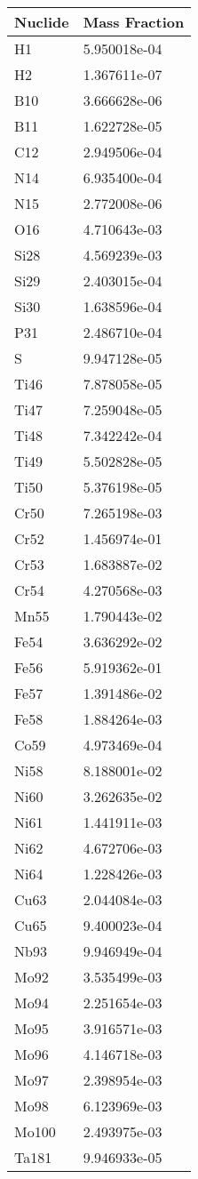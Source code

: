 \begin{centering}
\begin{longtable}[ht!]
\caption{Table showing the isotopic description of material M622}
\label{table:material_M622}
\end{longtable}\clearpage

\begin{longtable}[ht!]
{ p{} | p{} }
\hline
Nuclide & Mass Fraction\\
\hline
H1 & 5.950018e-04\\
H2 & 1.367611e-07\\
B10 & 3.666628e-06\\
B11 & 1.622728e-05\\
C12 & 2.949506e-04\\
N14 & 6.935400e-04\\
N15 & 2.772008e-06\\
O16 & 4.710643e-03\\
Si28 & 4.569239e-03\\
Si29 & 2.403015e-04\\
Si30 & 1.638596e-04\\
P31 & 2.486710e-04\\
S & 9.947128e-05\\
Ti46 & 7.878058e-05\\
Ti47 & 7.259048e-05\\
Ti48 & 7.342242e-04\\
Ti49 & 5.502828e-05\\
Ti50 & 5.376198e-05\\
Cr50 & 7.265198e-03\\
Cr52 & 1.456974e-01\\
Cr53 & 1.683887e-02\\
Cr54 & 4.270568e-03\\
Mn55 & 1.790443e-02\\
Fe54 & 3.636292e-02\\
Fe56 & 5.919362e-01\\
Fe57 & 1.391486e-02\\
Fe58 & 1.884264e-03\\
Co59 & 4.973469e-04\\
Ni58 & 8.188001e-02\\
Ni60 & 3.262635e-02\\
Ni61 & 1.441911e-03\\
Ni62 & 4.672706e-03\\
Ni64 & 1.228426e-03\\
Cu63 & 2.044084e-03\\
Cu65 & 9.400023e-04\\
Nb93 & 9.946949e-04\\
Mo92 & 3.535499e-03\\
Mo94 & 2.251654e-03\\
Mo95 & 3.916571e-03\\
Mo96 & 4.146718e-03\\
Mo97 & 2.398954e-03\\
Mo98 & 6.123969e-03\\
Mo100 & 2.493975e-03\\
Ta181 & 9.946933e-05\\


\end{longtable}
\end{centering}
